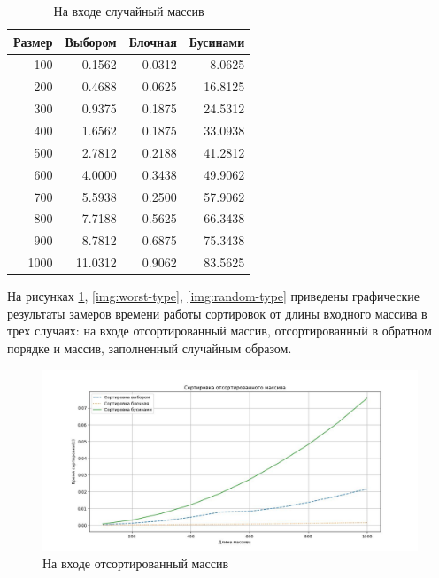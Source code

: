 \begin{table}[h]
	\begin{center}
		\begin{threeparttable}
		\captionsetup{justification=raggedright,singlelinecheck=off}
		\caption{На входе случайный массив}
		\label{tbl:random}
		\begin{tabular}{|r|r|r|r|}
			\hline
			Размер & Выбором & Блочная & Бусинами \\
			\hline
  			  100 & 0.1562 & 0.0312 & 8.0625 \\ 
  			\hline
  			200 & 0.4688 & 0.0625 & 16.8125 \\ 
  			\hline
  			300 & 0.9375 & 0.1875 & 24.5312 \\ 
  			\hline
  			400 & 1.6562 & 0.1875 & 33.0938 \\ 
  			\hline
  			500 & 2.7812 & 0.2188 & 41.2812 \\ 
  			\hline
  			600 & 4.0000 & 0.3438 & 49.9062 \\ 
  			\hline
  			700 & 5.5938 & 0.2500 & 57.9062 \\ 
  			\hline
  			800 & 7.7188 & 0.5625 & 66.3438 \\ 
  			\hline
  			900 & 8.7812 & 0.6875 & 75.3438 \\ 
  			\hline
  			1000 & 11.0312 & 0.9062 & 83.5625 \\ 
  			\hline
		\end{tabular}
		\end{threeparttable}
    \end{center}
\end{table}

На рисунках \ref{img:best-type}, \ref{img:worst-type}, \ref{img:random-type} приведены графические результаты замеров времени работы сортировок от длины входного массива в трех случаях: на входе отсортированный массив, отсортированный в обратном порядке и массив, заполненный случайным образом.

\begin{figure}[H]
	\begin{center}
		\includegraphics[scale=0.5]{img/best-type.jpg}
	\end{center}
	\captionsetup{justification=centering}
	\caption{На входе отсортированный массив}
	\label{img:best-type}
\end{figure}

